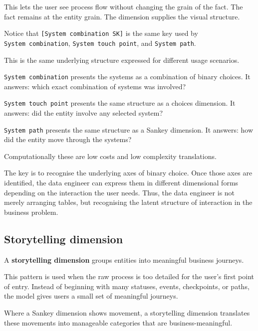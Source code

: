 \documentclass[10pt,openany,10pt]{book}
\begin{document}
This lets the user see process flow without changing the grain of the
fact. The fact remains at the entity grain. The dimension supplies the
visual structure.

Notice that \texttt{{[}System\ combination\ SK{]}} is the same key used
by \texttt{\textquotesingle{}System\ combination\textquotesingle{}},
\texttt{\textquotesingle{}System\ touch\ point\textquotesingle{}}, and
\texttt{\textquotesingle{}System\ path\textquotesingle{}}.

This is the same underlying structure expressed for different usage
scenarios.

\texttt{\textquotesingle{}System\ combination\textquotesingle{}}
presents the systems as a combination of binary choices. It answers:
which exact combination of systems was involved?

\texttt{\textquotesingle{}System\ touch\ point\textquotesingle{}}
presents the same structure as a choices dimension. It answers: did the
entity involve any selected system?

\texttt{\textquotesingle{}System\ path\textquotesingle{}} presents the
same structure as a Sankey dimension. It answers: how did the entity
move through the systems?

Computationally these are low costs and low complexity translations.

The key is to recognise the underlying axes of binary choice. Once those
axes are identified, the data engineer can express them in different
dimensional forms depending on the interaction the user needs. Thus, the
data engineer is not merely arranging tables, but recognising the latent
structure of interaction in the business problem.

\subsection{Storytelling dimension}\label{storytelling-dimension}

A \textbf{storytelling dimension} groups entities into meaningful
business journeys.

This pattern is used when the raw process is too detailed for the user's
first point of entry. Instead of beginning with many statuses, events,
checkpoints, or paths, the model gives users a small set of meaningful
journeys.

Where a Sankey dimension shows movement, a storytelling dimension
translates these movements into manageable categories that are
business-meaningful.
\end{document}
